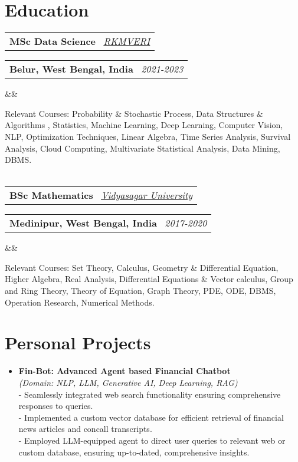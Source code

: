\documentclass[11pt,a4paper,sans]{moderncv}
\makeatletter
\newcommand*{\customcventry}[7][.13em]{
\begin{tabular}{@{}l}
{\bfseries #4} \
{\itshape #3}
\end{tabular}
\hfill
\begin{tabular}{l@{}}
{\bfseries #5} \
{\itshape #2}
\end{tabular}
\ifx&#7&%
\else{\
\begin{minipage}{\maincolumnwidth}%
\small#7%
\end{minipage}}\fi%
\par\addvspace{#1}}
\makeatother
\begin{document}
\section{Education}
\customcventry{2021-2023}{\color{blue}\href{https://rkmvu.ac.in}{RKMVERI}}{MSc Data Science}{Belur, West Bengal, India} {}{}
{{Relevant Courses: Probability \& Stochastic Process, Data Structures \& Algorithms
, Statistics, Machine Learning, Deep Learning, Computer Vision, NLP, Optimization Techniques, Linear Algebra, Time Series Analysis, Survival Analysis, Cloud Computing, Multivariate Statistical Analysis, Data Mining, DBMS.} }
\\
\\
\customcventry{2017-2020}{\color{blue}\href{https://rkmvu.ac.in}{Vidyasagar University}}{BSc Mathematics}{Medinipur, West Bengal, India} {}{}
{{Relevant Courses: Set Theory, Calculus, Geometry \& Differential Equation, Higher Algebra, Real Analysis, Differential Equations \& Vector calculus, Group and Ring Theory, Theory of Equation, Graph Theory, PDE, ODE, DBMS, Operation Research, Numerical Methods.}}

\section{Personal Projects}
{\begin{itemize}[label=\textbullet]
\item {
\textbf{Fin-Bot: Advanced Agent based Financial Chatbot} \href{https://www.youtube.com/watch?v=yhfRhK09RCc}{}\\ 
\textit{(Domain: NLP, LLM, Generative AI, Deep Learning, RAG)} }
\\- Seamlessly integrated web search functionality ensuring comprehensive responses to queries.
\\- Implemented a custom vector database for efficient retrieval of financial news articles and concall transcripts.
\\- Employed LLM-equipped agent to direct user queries to relevant web or custom database, ensuring up-to-dated, comprehensive insights.
\end{itemize}}
\end{document}
